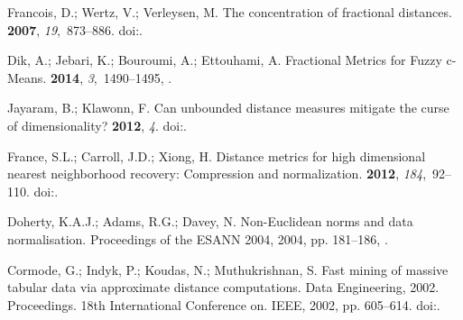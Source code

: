 \documentclass[entropy,article,submit,moreauthors,pdftex]{Definitions/mdpi}
\begin{document}
\begin{thebibliography}{-------}
Francois, D.; Wertz, V.; Verleysen, M.
\newblock The concentration of fractional distances.
 {\bf 2007}, {\em 19},~873--886.
\newblock
  doi:{\href{https://doi.org/10.1109/tkde.2007.1037}{}}.

Dik, A.; Jebari, K.; Bouroumi, A.; Ettouhami, A.
\newblock Fractional Metrics for Fuzzy c-Means.
 {\bf 2014}, {\em 3},~1490--1495,
  \href{https://www.ijcit.com/archives/volume3/issue6/Paper030641.pdf}{{}}.

Jayaram, B.; Klawonn, F.
\newblock Can unbounded distance measures mitigate the curse of dimensionality?
 {\bf 2012}, {\em 4}.
\newblock
  doi:{\href{https://doi.org/10.1504/ijdmmm.2012.049883}{}}.

France, S.L.; Carroll, J.D.; Xiong, H.
\newblock Distance metrics for high dimensional nearest neighborhood recovery:
  Compression and normalization.
 {\bf 2012}, {\em 184},~92--110.
\newblock
  doi:{\href{https://doi.org/10.1016/j.ins.2011.07.048}{}}.

Doherty, K.A.J.; Adams, R.G.; Davey, N.
\newblock Non-{E}uclidean norms and data normalisation.
\newblock  Proceedings of the ESANN 2004,  2004, pp. 181--186,
  \href{https://www.elen.ucl.ac.be/Proceedings/esann/esannpdf/es2004-65.pdf}{{}}.

Cormode, G.; Indyk, P.; Koudas, N.; Muthukrishnan, S.
\newblock Fast mining of massive tabular data via approximate distance
  computations.
\newblock  Data Engineering, 2002. Proceedings. 18th International Conference
  on. IEEE,  2002, pp. 605--614.
\newblock
  doi:{\href{https://doi.org/10.1109/icde.2002.994778}{}}.


\end{thebibliography}
\end{document}
